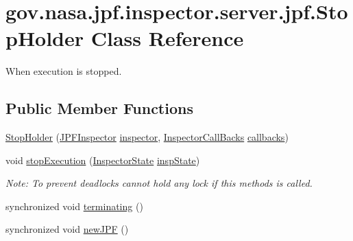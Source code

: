 \hypertarget{classgov_1_1nasa_1_1jpf_1_1inspector_1_1server_1_1jpf_1_1_stop_holder}{}\section{gov.\+nasa.\+jpf.\+inspector.\+server.\+jpf.\+Stop\+Holder Class Reference}
\label{classgov_1_1nasa_1_1jpf_1_1inspector_1_1server_1_1jpf_1_1_stop_holder}


When execution is stopped.  


\subsection*{Public Member Functions}
\begin{DoxyCompactItemize}
\item 
\hyperlink{classgov_1_1nasa_1_1jpf_1_1inspector_1_1server_1_1jpf_1_1_stop_holder_ae568b296b6d705f2126740b13f213b67}{Stop\+Holder} (\hyperlink{classgov_1_1nasa_1_1jpf_1_1inspector_1_1server_1_1jpf_1_1_j_p_f_inspector}{J\+P\+F\+Inspector} \hyperlink{classgov_1_1nasa_1_1jpf_1_1inspector_1_1server_1_1jpf_1_1_stop_holder_ad7eae9e53d25e2777d747423d71ddf0e}{inspector}, \hyperlink{interfacegov_1_1nasa_1_1jpf_1_1inspector_1_1interfaces_1_1_inspector_call_backs}{Inspector\+Call\+Backs} \hyperlink{classgov_1_1nasa_1_1jpf_1_1inspector_1_1server_1_1jpf_1_1_stop_holder_a0f6e1696842fdce668e4246c3344c240}{callbacks})
\item 
void \hyperlink{classgov_1_1nasa_1_1jpf_1_1inspector_1_1server_1_1jpf_1_1_stop_holder_aae2d616c9e1b16fea4e9240b111b7ae3}{stop\+Execution} (\hyperlink{interfacegov_1_1nasa_1_1jpf_1_1inspector_1_1server_1_1expression_1_1_inspector_state}{Inspector\+State} \hyperlink{classgov_1_1nasa_1_1jpf_1_1inspector_1_1server_1_1jpf_1_1_stop_holder_a9fe94c33b32604112b8cf9bc0a72f401}{insp\+State})
\begin{DoxyCompactList}\small\item\em Note\+: To prevent deadlocks cannot hold any lock if this methods is called. \end{DoxyCompactList}\item 
synchronized void \hyperlink{classgov_1_1nasa_1_1jpf_1_1inspector_1_1server_1_1jpf_1_1_stop_holder_abbb22c4a2b9bdf17d7014ac7f49014d8}{terminating} ()
\item 
synchronized void \hyperlink{classgov_1_1nasa_1_1jpf_1_1inspector_1_1server_1_1jpf_1_1_stop_holder_a71f968be313be8972b4793cb6695e2c9}{new\+J\+PF} ()

\end{DoxyCompactItemize}
